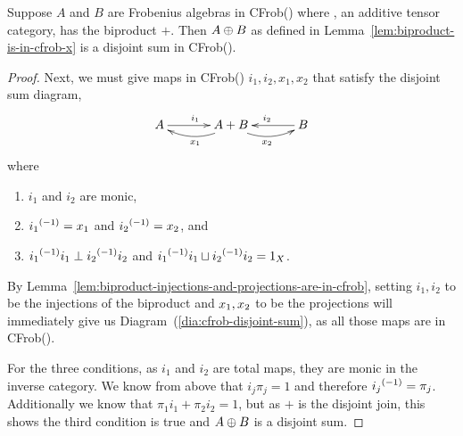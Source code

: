 \begin{proposition}\label{prop:cfrobx_has_disjoint_sums}
  Suppose $A$ and $B$ are Frobenius algebras in CFrob(\X) where \X, an additive tensor category, has
  the biproduct $+$.
  Then $A\oplus B$ as defined in Lemma~\ref{lem:biproduct-is-in-cfrob-x} is a disjoint sum in CFrob(\X).
\end{proposition}
\begin{proof}
  Next, we must give maps in CFrob(\X) $i_1,i_2,x_1,x_2$ that satisfy the disjoint sum diagram,
  \begin{equation}
    \xymatrix@C+10pt{
      A\ar[r]^{i_1} &A+B\ar@/^9pt/[l]^{x_1} \ar@/_9pt/[r]_{x_2} & B \ar[l]_{i_2}
    }\label{dia:cfrob-disjoint-sum}
  \end{equation}
  where
  \begin{enumerate}[{(}i{)}]
    \item $i_1$ and $i_2$ are monic,
    \item ${i_1}^{(-1)} = x_1$ and ${i_2}^{(-1)} = x_2$, and
    \item ${i_1}^{(-1)}i_1 \perp {i_2}^{(-1)}i_2$ and ${i_1}^{(-1)}i_1 \sqcup {i_2}^{(-1)}i_2 = 1_X$.
  \end{enumerate}

  By Lemma~\ref{lem:biproduct-injections-and-projections-are-in-cfrob}, setting $i_1,i_2$ to be the
  injections of the biproduct and $x_1,x_2$ to be the projections will immediately give us
  Diagram~(\ref{dia:cfrob-disjoint-sum}), as all those maps are in CFrob(\X).

  For the three conditions, as $i_1$ and $i_2$ are total maps, they are monic in the inverse
  category. We know from above that $i_j\pi_j = 1$ and therefore ${i_j}^{(-1)} = \pi_j$. Additionally
  we know that $\pi_1i_1 + \pi_2i_2 = 1$, but as $+$ is the disjoint join, this shows the third
  condition is true and $A\oplus B$ is a disjoint sum.
\end{proof}



